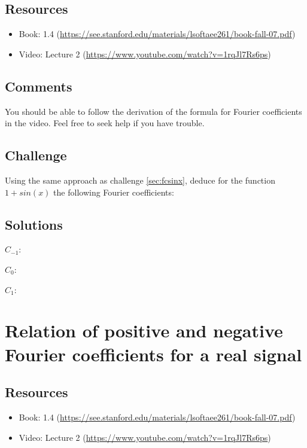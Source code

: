 \subsection*{Resources}
\begin{itemize}
    \item Book: 1.4 (\url{https://see.stanford.edu/materials/lsoftaee261/book-fall-07.pdf})
    \item Video: Lecture 2 (\url{https://www.youtube.com/watch?v=1rqJl7Rs6ps})
\end{itemize}

\subsection*{Comments}
You should be able to follow the derivation of the formula for Fourier coefficients in the video. Feel free to seek help if you have trouble.

\subsection*{Challenge}
Using the same approach as challenge \ref{sec:fcsinx}, deduce for the function $1+sin(x)$ the following Fourier coefficients:

\subsection*{Solutions}
$C_{-1}$: 

$C_0$: 

$C_1$: 




\newpage

\section{Relation of positive and negative Fourier coefficients for a real signal}

\subsection*{Resources}
\begin{itemize}
    \item Book: 1.4 (\url{https://see.stanford.edu/materials/lsoftaee261/book-fall-07.pdf})
    \item Video: Lecture 2 (\url{https://www.youtube.com/watch?v=1rqJl7Rs6ps})
\end{itemize}

